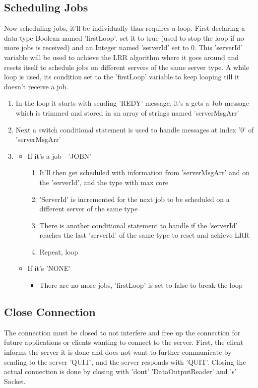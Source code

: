 \documentclass[a4paper]{article} %
\begin{document}
\subsection{Scheduling Jobs}
Now scheduling jobs, it'll be individually thus requires a loop. First declaring a data type Boolean named 'firstLoop', set it to true (used to stop the loop if no more jobs is received) and an Integer named 'serverId' set to 0. This 'serverId' variable will be used to achieve the LRR algorithm where it goes around and resets itself to schedule jobs on different servers of the same server type. A while loop is used, its condition set to the 'firstLoop' variable to keep looping till it doesn't receive a job.
\begin{enumerate}
    \item In the loop it starts with sending 'REDY' message, it's a gets a Job message which is trimmed and stored in an array of strings named 'serverMsgArr'
    \item Next a switch conditional statement is used to handle messages at index '0' of 'serverMsgArr'
    \item
        \begin{itemize}
            \item If it's a job - 'JOBN'
            \begin{enumerate}
                \item It'll then get scheduled with information from 'serverMsgArr' and on the 'serverId', and the type with max core
                \item 'ServerId' is incremented for the next job to be scheduled on a different server of the same type
                \item There is another conditional statement to handle if the 'serverId' reaches the last 'serverId' of the same type to reset and achieve LRR
                \item Repeat, loop
            \end{enumerate}
            \item If it's 'NONE'
                \begin{itemize}
                    \item There are no more jobs, 'firstLoop' is set to false to break the loop
                \end{itemize}
        \end{itemize}
\end{enumerate}

\subsection{Close Connection}
The connection must be closed to not interfere and free up the connection for future applications or clients wanting to connect to the server. First, the client informs the server it is done and does not want to further communicate by sending to the server 'QUIT', and the server responds with 'QUIT'. Closing the actual connection is done by closing with 'dout' 'DataOutputReader' and 's' Socket.
\end{document}
